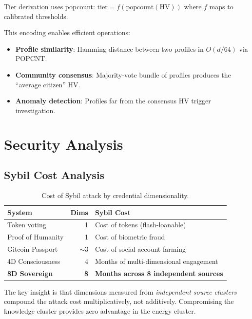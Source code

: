 \documentclass[11pt,twocolumn]{article}
\begin{document}
Tier derivation uses popcount: $\text{tier} = f(\text{popcount}(\text{HV}))$ where $f$ maps to calibrated thresholds.

This encoding enables efficient operations:
\begin{itemize}[nosep]
  \item \textbf{Profile similarity}: Hamming distance between two profiles in $O(d/64)$ via POPCNT.
  \item \textbf{Community consensus}: Majority-vote bundle of profiles produces the ``average citizen'' HV.
  \item \textbf{Anomaly detection}: Profiles far from the consensus HV trigger investigation.
\end{itemize}

\section{Security Analysis}
\label{sec:security}

\subsection{Sybil Cost Analysis}

\begin{table}[H]
\centering
\caption{Cost of Sybil attack by credential dimensionality.}
\label{tab:sybil}
\begin{tabular}{lrl}
\toprule
\textbf{System} & \textbf{Dims} & \textbf{Sybil Cost} \\
\midrule
Token voting & 1 & Cost of tokens (flash-loanable) \\
Proof of Humanity & 1 & Cost of biometric fraud \\
Gitcoin Passport & $\sim$3 & Cost of social account farming \\
4D Consciousness & 4 & Months of multi-dimensional engagement \\
\textbf{8D Sovereign} & \textbf{8} & \textbf{Months across 8 independent sources} \\
\bottomrule
\end{tabular}
\end{table}

The key insight is that dimensions measured from \emph{independent source clusters} compound the attack cost multiplicatively, not additively. Compromising the knowledge cluster provides zero advantage in the energy cluster.
\end{document}
